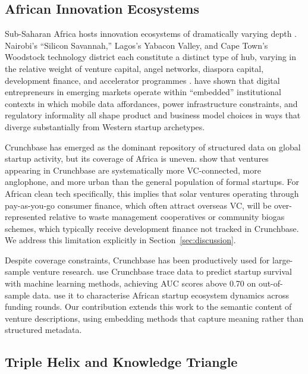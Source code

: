 \documentclass[review,12pt]{elsarticle}
\begin{document}
\subsection{African Innovation Ecosystems}

Sub-Saharan Africa hosts innovation ecosystems of dramatically varying
depth \citep{naude2017entrepreneurship}. Nairobi's ``Silicon
Savannah,'' Lagos's Yabacon Valley, and Cape Town's Woodstock
technology district each constitute a distinct type of hub, varying in
the relative weight of venture capital, angel networks, diaspora
capital, development finance, and accelerator programmes
\citep{cbinsights2023africa}. \citet{arora2022embedded} have shown
that digital entrepreneurs in emerging markets operate within
``embedded'' institutional contexts in which mobile data affordances,
power infrastructure constraints, and regulatory informality all shape
product and business model choices in ways that diverge substantially
from Western startup archetypes.

Crunchbase has emerged as the dominant repository of structured data
on global startup activity, but its coverage of Africa is uneven.
\citet{rodriguez2021crunchbase} show that ventures appearing in
Crunchbase are systematically more VC-connected, more anglophone, and
more urban than the general population of formal startups. For African
clean tech specifically, this implies that solar ventures operating
through pay-as-you-go consumer finance, which often attract overseas
VC, will be over-represented relative to waste management cooperatives
or community biogas schemes, which typically receive development
finance not tracked in Crunchbase. We address this limitation
explicitly in Section~\ref{sec:discussion}.

Despite coverage constraints, Crunchbase has been productively used
for large-sample venture research. \citet{antretter2019predicting}
use Crunchbase trace data to predict startup survival with machine
learning methods, achieving AUC scores above 0.70 on out-of-sample
data. \citet{rodriguez2021crunchbase} use it to characterise African
startup ecosystem dynamics across funding rounds. Our contribution
extends this work to the semantic content of venture descriptions,
using embedding methods that capture meaning rather than structured
metadata.

\subsection{Triple Helix and Knowledge Triangle}
\end{document}
